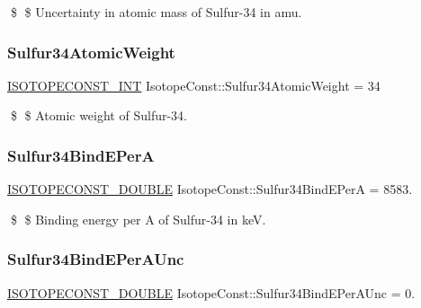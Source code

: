 \$ \$ Uncertainty in atomic mass of Sulfur-\/34 in amu. \mbox{\label{group___isotope_const-_sulfur-_s34_ga0e72962563df57e3ca9bbbb73f5a2e3f}} 
\subsubsection{\texorpdfstring{Sulfur34\+Atomic\+Weight}{Sulfur34AtomicWeight}}
{\footnotesize\ttfamily \mbox{\hyperlink{group___isotope_const-_macros_ga5f18360b3e99483a35c32d789e62621c}{I\+S\+O\+T\+O\+P\+E\+C\+O\+N\+S\+T\+\_\+\+I\+NT}} Isotope\+Const\+::\+Sulfur34\+Atomic\+Weight = 34}

\$ \$ Atomic weight of Sulfur-\/34. \mbox{\label{group___isotope_const-_sulfur-_s34_gaf769cd9a5459d5bdea95f0c1ba10ac06}} 
\subsubsection{\texorpdfstring{Sulfur34\+Bind\+E\+PerA}{Sulfur34BindEPerA}}
{\footnotesize\ttfamily \mbox{\hyperlink{group___isotope_const-_macros_ga8f45a7272ce02c0b4c65c44636ed719a}{I\+S\+O\+T\+O\+P\+E\+C\+O\+N\+S\+T\+\_\+\+D\+O\+U\+B\+LE}} Isotope\+Const\+::\+Sulfur34\+Bind\+E\+PerA = 8583.}

\$ \$ Binding energy per A of Sulfur-\/34 in keV. \mbox{\label{group___isotope_const-_sulfur-_s34_gab4987ca035134b751f1ef6c5bdb966bd}} 
\subsubsection{\texorpdfstring{Sulfur34\+Bind\+E\+Per\+A\+Unc}{Sulfur34BindEPerAUnc}}
{\footnotesize\ttfamily \mbox{\hyperlink{group___isotope_const-_macros_ga8f45a7272ce02c0b4c65c44636ed719a}{I\+S\+O\+T\+O\+P\+E\+C\+O\+N\+S\+T\+\_\+\+D\+O\+U\+B\+LE}} Isotope\+Const\+::\+Sulfur34\+Bind\+E\+Per\+A\+Unc = 0.}

